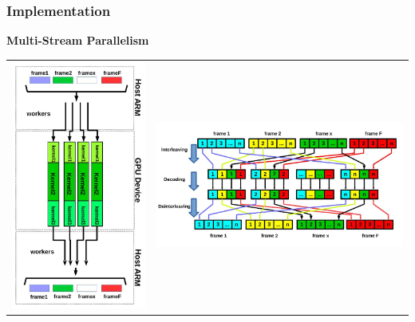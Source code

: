 \documentclass{beamer}
\begin{document}
\begin{frame}
  \frametitle{Implementation}
	\textbf{Multi-Stream Parallelism}

{\small
\begin{tabular}{p{4cm} l}
\includegraphics[keepaspectratio=true,width=.25\paperwidth,valign=c]{img/total_new.jpg}&
\includegraphics[keepaspectratio=true,width=.5\paperwidth,valign=c]{img/inter1.jpg}
   \end{tabular}}


\end{frame}
\end{document}
